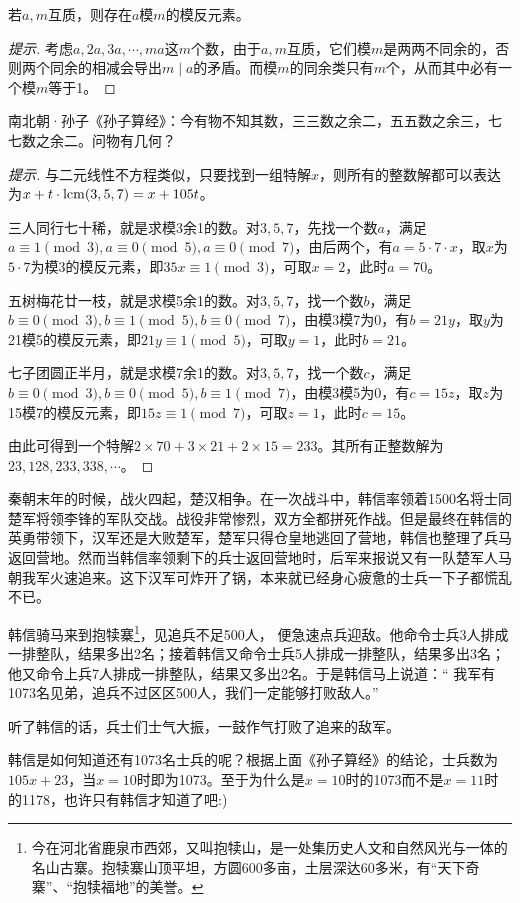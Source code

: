 \begin{theorem}[模反的存在性]
  若$a,m$互质，则存在$a$模$m$的模反元素。
\end{theorem}
\begin{proof}[提示]
  考虑$a,2a,3a,\cdots,ma$这$m$个数，由于$a,m$互质，它们模$m$是两两不同余的，否则两个同余的相减会导出$m\mid a$的矛盾。而模$m$的同余类只有$m$个，从而其中必有一个模$m$等于1。
\end{proof}

\begin{example}
  南北朝·孙子《孙子算经》：今有物不知其数，三三数之余二，五五数之余三，七七数之余二。问物有几何？
\end{example}
\begin{proof}[提示]
  与二元线性不方程类似，只要找到一组特解$x$，则所有的整数解都可以表达为$x+t\cdot\mathrm{lcm}(3,5,7)=x+105t$。

  三人同行七十稀，就是求模3余1的数。对$3,5,7$，先找一个数$a$，满足$a\equiv 1\pmod3, a\equiv0\pmod5, a\equiv0\pmod7$，由后两个，有$a=5\cdot7\cdot x$，取$x$为$5\cdot 7$为模$3$的模反元素，即$35x\equiv1\pmod3$，可取$x=2$，此时$a=70$。

  五树梅花廿一枝，就是求模5余1的数。对$3,5,7$，找一个数$b$，满足$b\equiv0\pmod3, b\equiv1\pmod5,b\equiv0\pmod7$，由模3模7为0，有$b=21y$，取$y$为21模5的模反元素，即$21y\equiv1\pmod5$，可取$y=1$，此时$b=21$。

  七子团圆正半月，就是求模7余1的数。对$3,5,7$，找一个数$c$，满足$b\equiv0\pmod3, b\equiv0\pmod5,b\equiv1\pmod7$，由模3模5为0，有$c=15z$，取$z$为15模7的模反元素，即$15z\equiv1\pmod7$，可取$z=1$，此时$c=15$。

  由此可得到一个特解$2\times 70+3\times 21+2\times 15=233$。其所有正整数解为$23,128,233,338,\cdots$。
\end{proof}

\begin{example}[韩信点兵]
  秦朝末年的时候，战火四起，楚汉相争。在一次战斗中，韩信率领着1500名将士同楚军将领李锋的军队交战。战役非常惨烈，双方全都拼死作战。但是最终在韩信的英勇带领下，汉军还是大败楚军，楚军只得仓皇地逃回了营地，韩信也整理了兵马返回营地。然而当韩信率领剩下的兵士返回营地时，后军来报说又有一队楚军人马朝我军火速追来。这下汉军可炸开了锅，本来就已经身心疲惫的士兵一下子都慌乱不已。

  韩信骑马来到抱犊寨\footnote{今在河北省鹿泉市西郊，又叫抱犊山，是一处集历史人文和自然风光与一体的名山古寨。抱犊寨山顶平坦，方圆600多亩，土层深达60多米，有“天下奇寨”、“抱犊福地”的美誉。}，见追兵不足500人， 便急速点兵迎敌。他命令士兵3人排成一排整队，结果多出2名；接着韩信又命令士兵5人排成一排整队，结果多出3名；他又命令上兵7人排成一排整队，结果又多出2名。于是韩信马上说道：“ 我军有1073名见弟，追兵不过区区500人，我们一定能够打败敌人。”

  听了韩信的话，兵士们士气大振，一鼓作气打败了追来的敌军。

  韩信是如何知道还有1073名士兵的呢？根据上面《孙子算经》的结论，士兵数为$105x + 23$，当$x=10$时即为1073。至于为什么是$x=10$时的1073而不是$x=11$时的1178，也许只有韩信才知道了吧:)
\end{example}

